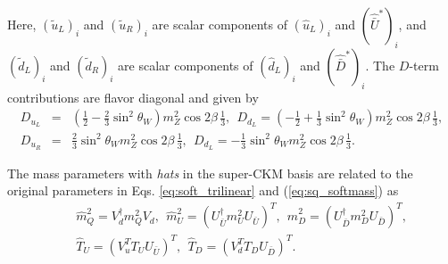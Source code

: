 \documentclass[preprint,3p,12pt]{elsarticle}
\begin{document}
 Here, $(\tilde u_L)_i$ and $(\tilde u_R)_i$ are scalar components of $(\hat u_L)_i$ and $(\hat{\bar U}^*)_i$, and 
 $(\tilde d_L)_i$ and $(\tilde d_R)_i$ are scalar components of $(\hat d_L)_i$ and $(\hat{\bar D}^*)_i$. The $D$-term contributions are flavor diagonal and given by
\begin{eqnarray}
D_{u_L} &=& (\frac{1}{2} - \frac{2}{3} \sin^2\theta_W) m_Z^2 \cos2 \beta \, \frac{1}{3}, \ \
D_{d_L} = (-\frac{1}{2} + \frac{1}{3} \sin^2\theta_W) m_Z^2 \cos2 \beta \, \frac{1}{3}, \nonumber \\
D_{u_R}&=& \frac{2}{3} \sin^2\theta_W m_Z^2 \cos2 \beta \, \frac{1}{3}, \ \ 
D_{d_L} =  -\frac{1}{3} \sin^2\theta_W m_Z^2 \cos2 \beta \, \frac{1}{3}.
\end{eqnarray}

 The mass parameters with {\it hats} in the super-CKM basis are related to the original parameters in Eqs. \eqref{eq:soft_trilinear} and (\ref{eq:sq_softmass}) as
 \begin{eqnarray}
&& \hat m_{Q}^2 = V_{d}^\dag m_{Q}^2 V_d, \ \ \hat m_U^2  = (U_{\bar U}^\dag m_{U}^2 U_{\bar U})^T, 
\ \ \hat m_D^2  = (U_{\bar D}^\dag m_{D}^2 U_{\bar D})^T, \nonumber \\
&& \hat T_U = (V_u^T T_U U_{\bar U})^T, \ \ 
\hat T_D = (V_d^T T_D U_{\bar D})^T.
\end{eqnarray}
\end{document}

